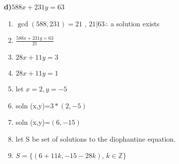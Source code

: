 \documentclass[12pt]{article}
\newcommand{\Z}{\mathbb{Z}}
\newenvironment{question}[2][Question]{\begin{trivlist}
\item[\hskip \labelsep {\bfseries #1}\hskip \labelsep {\bfseries #2.}]}{\end{trivlist}}
\begin{document}
\begin{question}{6.9}
\textbf{d)}$588x+231y=63$\\
\begin{enumerate}
	\item $\gcd(588,231)=21$ , $21 | 63 \therefore$ a solution exists
	\item $\frac{588x+231y=63}{21}$
	\item $28x+11y=3$
	\item $28x+11y=1$
	\item let $x=2,y=-5$
	\item soln (x,y)=$3*(2,-5)$
	\item soln (x,y)=$(6,-15)$
	\item let S be set of solutions to the diophantine equation.
	\item $S = \{(6+11k, -15-28k)$, $k \in \Z \}$
\end{enumerate}
\end{question}
\end{document}
